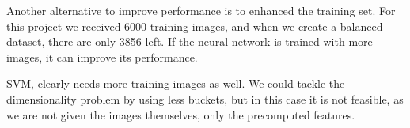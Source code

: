 \documentclass{article} %
\begin{document}
Another alternative to improve performance is to enhanced the training set. 
For this project we received 6000 training images, and when we create a balanced dataset, there are only 3856 left.
If the neural network is trained with more images, it can improve its performance.

SVM, clearly needs more training images as well. We could tackle the dimensionality problem by using less buckets, but in this case it is not feasible, as we are not given the images themselves, only the precomputed features.



\end{document}
